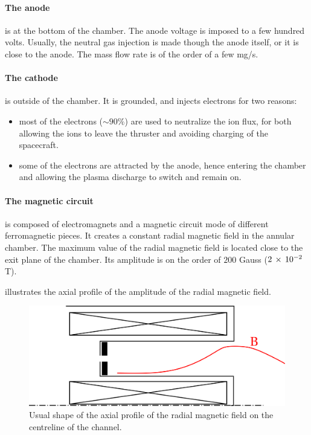 \paragraph{The anode} is at the bottom of the chamber.
The anode voltage is imposed to a few hundred volts.
Usually, the neutral gas injection is made though the anode itself, or it is close to the anode.
The mass flow rate is of the order of a few mg/s.

\paragraph{The cathode} is outside of the chamber.
It is grounded, and injects electrons for two reasons\string:
\begin{itemize}
  \item most of the electrons ($\sim 90 \%$) are used to neutralize the ion flux, for both allowing the ions to leave the thruster and avoiding charging of the spacecraft.
  \item some of the electrons are attracted by the anode, hence entering the chamber and allowing the plasma discharge to switch and remain on.
\end{itemize}

\paragraph{The magnetic circuit} is composed of electromagnets and a magnetic circuit mode of different ferromagnetic pieces.
It creates a constant radial magnetic field in the annular chamber.
The maximum value of the radial magnetic field is located close to the exit plane of the chamber.
Its amplitude is on the order of $200$ Gauss (${2}\,\times\,10^{-2}$ T).

 illustrates the axial profile of the amplitude of the radial magnetic field.
\begin{figure}[hbtp]
  \centering
  \includegraphics[width=\defaultwidth]{bshape}
  \caption{Usual shape of the axial profile of the radial magnetic field on the centreline of the channel.}
  \label{fig-bshape}
\end{figure}



